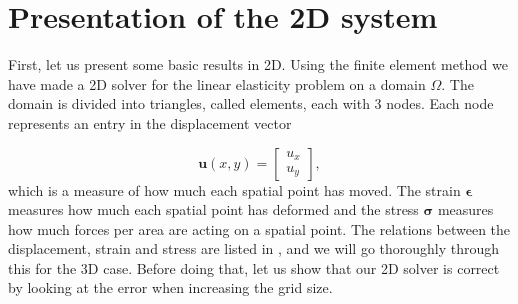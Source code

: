 \section{Presentation of the 2D system}

First, let us present some basic results in 2D. Using the finite element method we have made a 2D solver for the linear elasticity problem on a domain $\Omega$. The domain is divided into triangles, called elements, each with 3 nodes. Each node represents an entry in the displacement vector

\begin{equation}
\bm{u}(x,y) = 
\begin{bmatrix}
u_x \\
u_y
\end{bmatrix},
\end{equation}
which is a measure of how much each spatial point has moved. The strain $\bm{\epsilon}$ measures how much each spatial point has deformed and the stress $\bm{\sigma}$ measures how much forces per area are acting on a spatial point. The relations between the displacement, strain and stress are listed in \cite{note2}, and we will go thoroughly through this for the 3D case. Before doing that, let us show that our 2D solver is correct by looking at the error when increasing the grid size.



